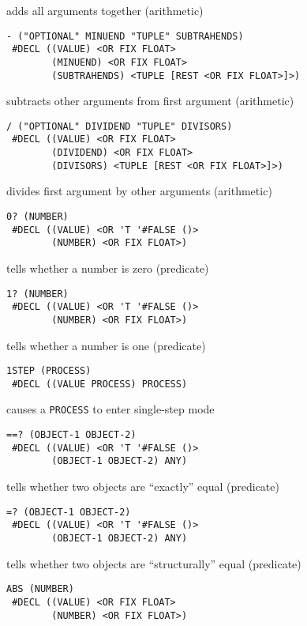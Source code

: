 \documentclass[a4paper,]{article}
\begin{document}
adds all arguments together (arithmetic)

\begin{verbatim}
- ("OPTIONAL" MINUEND "TUPLE" SUBTRAHENDS)
 #DECL ((VALUE) <OR FIX FLOAT>
        (MINUEND) <OR FIX FLOAT>
        (SUBTRAHENDS) <TUPLE [REST <OR FIX FLOAT>]>)
\end{verbatim}

subtracts other arguments from first argument (arithmetic)

\begin{verbatim}
/ ("OPTIONAL" DIVIDEND "TUPLE" DIVISORS)
 #DECL ((VALUE) <OR FIX FLOAT>
        (DIVIDEND) <OR FIX FLOAT>
        (DIVISORS) <TUPLE [REST <OR FIX FLOAT>]>)
\end{verbatim}

divides first argument by other arguments (arithmetic)

\begin{verbatim}
0? (NUMBER)
 #DECL ((VALUE) <OR 'T '#FALSE ()>
        (NUMBER) <OR FIX FLOAT>)
\end{verbatim}

tells whether a number is zero (predicate)

\begin{verbatim}
1? (NUMBER)
 #DECL ((VALUE) <OR 'T '#FALSE ()>
        (NUMBER) <OR FIX FLOAT>)
\end{verbatim}

tells whether a number is one (predicate)

\begin{verbatim}
1STEP (PROCESS)
 #DECL ((VALUE PROCESS) PROCESS)
\end{verbatim}

causes a \texttt{PROCESS} to enter single-step mode

\begin{verbatim}
==? (OBJECT-1 OBJECT-2)
 #DECL ((VALUE) <OR 'T '#FALSE ()>
        (OBJECT-1 OBJECT-2) ANY)
\end{verbatim}

tells whether two objects are ``exactly'' equal (predicate)

\begin{verbatim}
=? (OBJECT-1 OBJECT-2)
 #DECL ((VALUE) <OR 'T '#FALSE ()>
        (OBJECT-1 OBJECT-2) ANY)
\end{verbatim}

tells whether two objects are ``structurally'' equal (predicate)

\begin{verbatim}
ABS (NUMBER)
 #DECL ((VALUE) <OR FIX FLOAT>
        (NUMBER) <OR FIX FLOAT>)
\end{verbatim}
\end{document}
